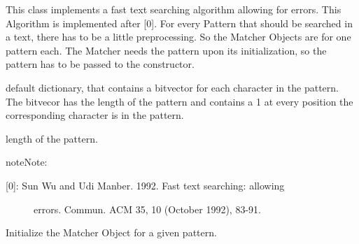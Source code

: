 \documentclass[letterpaper,10pt,english]{sphinxmanual}
\begin{document}
\begin{fulllineitems}
\label{\detokenize{api:approx_str_matching.Matcher}}
This class implements a fast text searching algorithm allowing for
errors. This Algorithm is implemented after {[}0{]}. For every Pattern
that should be searched in a text, there has to be a little
preprocessing. So the Matcher Objects are for one pattern
each. The Matcher needs the pattern upon its initialization, so
the pattern has to be passed to the constructor.

\begin{fulllineitems}
\label{\detokenize{api:approx_str_matching.Matcher.s}}
default dictionary, that contains a bitvector for each
character in the pattern. The bitvecor has the length of the
pattern and contains a 1 at every position the corresponding
character is in the pattern.

\end{fulllineitems}


\begin{fulllineitems}
\label{\detokenize{api:approx_str_matching.Matcher.m}}
length of the pattern.

\end{fulllineitems}


\begin{sphinxadmonition}{note}{Note:}\begin{description}
\item[{{[}0{]}: Sun Wu and Udi Manber. 1992. Fast text searching: allowing}] \leavevmode
errors. Commun. ACM 35, 10 (October 1992), 83-91.

\end{description}
\end{sphinxadmonition}

\begin{fulllineitems}
\label{\detokenize{api:approx_str_matching.Matcher.__init__}}
Initialize the Matcher Object for a given pattern.


\end{fulllineitems}
\end{fulllineitems}
\end{document}

